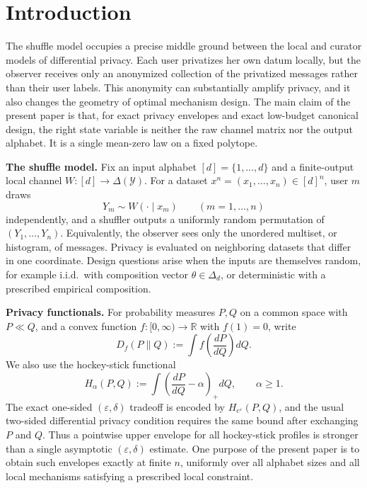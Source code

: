 \documentclass[11pt]{amsart}
\theoremstyle{definition}
\newcommand{\R}{\mathbb R}
\begin{document}
\maketitle
\tableofcontents


\section{Introduction}

The shuffle model occupies a precise middle ground between the local and curator models of differential privacy. Each user privatizes her own datum locally, but the observer receives only an anonymized collection of the privatized messages rather than their user labels. This anonymity can substantially amplify privacy, and it also changes the geometry of optimal mechanism design. The main claim of the present paper is that, for exact privacy envelopes and exact low-budget canonical design, the right state variable is neither the raw channel matrix nor the output alphabet. It is a single mean-zero law on a fixed polytope.

\medskip
\noindent\textbf{The shuffle model.}
Fix an input alphabet $[d]=\{1,\dots,d\}$ and a finite-output local channel $W:[d]\to \Delta(\mathcal Y)$. For a dataset $x^n=(x_1,\dots,x_n)\in [d]^n$, user $m$ draws
\[
Y_m\sim W(\cdot\mid x_m)
\qquad (m=1,\dots,n)
\]
independently, and a shuffler outputs a uniformly random permutation of $(Y_1,\dots,Y_n)$. Equivalently, the observer sees only the unordered multiset, or histogram, of messages. Privacy is evaluated on neighboring datasets that differ in one coordinate. Design questions arise when the inputs are themselves random, for example i.i.d.\ with composition vector $\theta\in \Delta_d$, or deterministic with a prescribed empirical composition.

\medskip
\noindent\textbf{Privacy functionals.}
For probability measures $P,Q$ on a common space with $P\ll Q$, and a convex function $f:[0,\infty)\to \R$ with $f(1)=0$, write
\[
D_f(P\|Q):=\int f\!\left(\frac{dP}{dQ}\right)dQ.
\]
We also use the hockey-stick functional
\[
H_\alpha(P,Q):=\int\left(\frac{dP}{dQ}-\alpha\right)_+ dQ,\qquad \alpha\ge 1.
\]
The exact one-sided $(\varepsilon,\delta)$ tradeoff is encoded by $H_{e^\varepsilon}(P,Q)$, and the usual two-sided differential privacy condition requires the same bound after exchanging $P$ and $Q$. Thus a pointwise upper envelope for all hockey-stick profiles is stronger than a single asymptotic $(\varepsilon,\delta)$ estimate. One purpose of the present paper is to obtain such envelopes exactly at finite $n$, uniformly over all alphabet sizes and all local mechanisms satisfying a prescribed local constraint.
\end{document}

